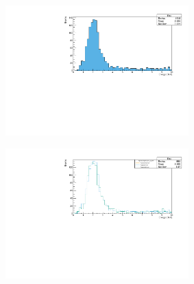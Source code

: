 \documentclass[12pt]{article}
\begin{document}
\newpage
\begin{figure}[h]
  \begin{subfigure}{0.49\textwidth}
   \centering
   \includegraphics[width=0.95\linewidth,height=5cm]{./figures/validgenie~Enu-Files~prod5-root.pdf}
   \caption{}
   \label{}
  \end{subfigure}
  \begin{subfigure}{0.49\textwidth}
   \centering
   \includegraphics[width=0.95\linewidth,height=5cm]{./figures/validgenie_Enu_layered.pdf}
   \caption{}
   \label{}
  \end{subfigure}
\end{figure}
\end{document}

